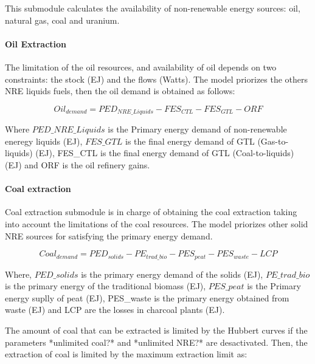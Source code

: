 

This submodule calculates the availability of non-renewable energy sources: oil, natural gas, coal and uranium.

\paragraph{Oil Extraction}
The limitation of the oil resources, and availability of oil depends on two constraints: the stock (EJ) and the flows (Watts). The model priorizes the others NRE liquids fuels, then the oil demand is obtained as follows:

\begin{equation}
Oil_{demand}=PED_{NRE\_Liquids}-FES_{CTL}- FES_{GTL}- ORF
\label{eq:oil-demand}
\end{equation}

Where $PED\_NRE\_Liquids$ is the Primary energy demand of non-renewable eneregy liquids (EJ), $FES\_GTL$ is the final energy demand of GTL (Gas-to-liquids) (EJ),  FES\_CTL is the final energy demand of GTL (Coal-to-liquids) (EJ) and ORF is the oil refinery gains.

\paragraph{Coal extraction}

Coal extraction submodule is in charge of obtaining the coal extraction taking into account the limitations of the coal resources. The model priorizes other solid NRE sources for satisfying the primary energy demand.

\begin{equation}
Coal_{demand}=PED_{solids}-PE_{trad\_bio}-PES_{peat}-PES_{waste}-LCP
\label{eq:coal-demand}
\end{equation}

Where, $PED\_solids$ is the primary energy demand of the solids (EJ), $PE\_trad\_bio$ is the primary energy of the traditional biomass (EJ), $PES\_peat$ is the Primary energy suplly of peat (EJ), PES\_waste is the primary energy obtained from waste (EJ) and LCP are the losses in charcoal plants (EJ).

The amount of coal that can be extracted is limited by the Hubbert curves if the parameters *unlimited coal?* and *unlimited NRE?* are desactivated. Then, the extraction of coal is limited by the maximum extraction limit as:

